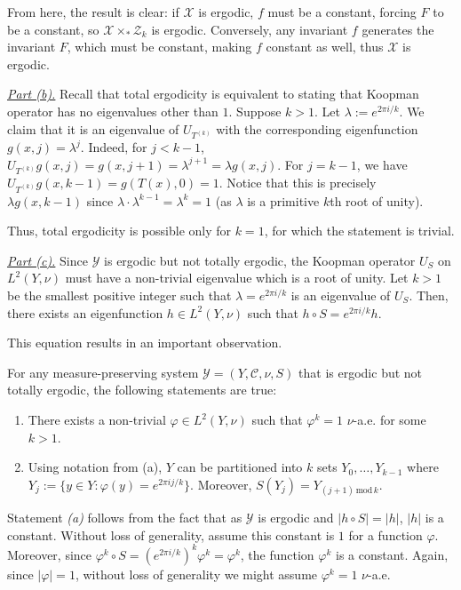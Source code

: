\documentclass{template}
\begin{document}
From here, the result is clear: if $\mathcal{X}$ is ergodic, $f$ must be a constant,
forcing $F$ to be a constant, so $\mathcal{X} \times_* \mathcal{Z}_k$ is ergodic.
Conversely, any invariant $f$ generates the invariant $F$, which must be constant,
making $f$ constant as well, thus $\mathcal{X}$ is ergodic.

\underline{\textit{Part (b).}} Recall that total ergodicity is equivalent to
stating that Koopman operator has no eigenvalues other than $1$. Suppose $k>1$.
Let $\lambda := e^{2\pi i/k}$. We claim that it is an eigenvalue of
$U_{T^{(k)}}$ with the corresponding eigenfunction $g(x,j) = \lambda^j$. Indeed,
for $j<k-1$, $U_{T^{(k)}}g(x,j) = g(x,j+1)=\lambda^{j+1}=\lambda g(x,j)$. For
$j=k-1$, we have $U_{T^{(k)}}g(x,k-1) = g(T(x),0)=1$. Notice that this is
precisely $\lambda g(x,k-1)$ since $\lambda \cdot \lambda^{k-1} = \lambda^k =
1$ (as $\lambda$ is a primitive $k$th root of unity).

Thus, total ergodicity is possible only for $k=1$, for which the statement is
trivial.

\underline{\textit{Part (c).}} Since $\mathcal{Y}$ is ergodic but not totally
ergodic, the Koopman operator $U_S$ on $L^2(Y,\nu)$ must have a non-trivial
eigenvalue which is a root of unity. Let $k>1$ be the smallest positive integer
such that $\lambda=e^{2\pi i/k}$ is an eigenvalue of $U_S$. Then, there exists
an eigenfunction $h \in L^2(Y,\nu)$ such that $h \circ S = e^{2\pi i/k}h$.

This equation results in an important observation.
\begin{proposition}
    For any measure-preserving system $\mathcal{Y}=(Y,\mathcal{C},\nu,S)$ that is ergodic but not totally ergodic, the following statements are true:
    \begin{enumerate}
        \item[(a)] There exists a non-trivial $\varphi \in L^2(Y,\nu)$ such that $\varphi^k=1$ $\nu$-a.e. for some $k>1$.
        \item[(b)] Using notation from (a), $Y$ can be partitioned into $k$ sets $Y_0,\dots,Y_{k-1}$ where $Y_j := \{y \in Y: \varphi(y) = e^{2\pi ij/k}\}$. Moreover, $S(Y_j) = Y_{(j+1) \, \text{mod} \, k}$. 
    \end{enumerate}
\end{proposition}

Statement \textit{(a)} follows from the fact that as $\mathcal{Y}$ is ergodic
and $|h \circ S| = |h|$, $|h|$ is a constant. Without loss of generality, assume
this constant is $1$ for a function $\varphi$. Moreover, since $\varphi^k \circ
S = (e^{2\pi i/k})^k \varphi^k = \varphi^k$, the function $\varphi^k$ is a
constant. Again, since $|\varphi|=1$, without loss of generality we might 
assume $\varphi^k=1$ $\nu$-a.e.
\end{document}
